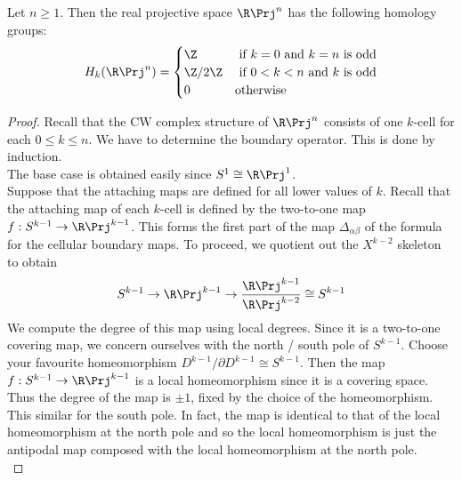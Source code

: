 \documentclass[a4paper]{article}
\begin{document}
\begin{eg}{}{} Let $n\geq 1$. Then the real projective space $\R\Prj^n$ has the following homology groups: $$H_k(\R\Prj^n)=\begin{cases}
\Z & \text{ if }k=0\text{ and }k=n\text{ is odd}\\
\Z/2\Z & \text{ if } 0<k<n\text{ and }k\text{ is odd}\\
0 & \text{otherwise}
\end{cases}$$ 
\begin{proof}
Recall that the CW complex structure of $\R\Prj^n$ consists of one $k$-cell for each $0\leq k\leq n$. We have to determine the boundary operator. This is done by induction. \\

The base case is obtained easily since $S^1\cong\R\Prj^1$. \\

Suppose that the attaching maps are defined for all lower values of $k$. Recall that the attaching map of each $k$-cell is defined by the two-to-one map $f:S^{k-1}\to\R\Prj^{k-1}$. This forms the first part of the map $\Delta_{\alpha\beta}$ of the formula for the cellular boundary maps. To proceed, we quotient out the $X^{k-2}$ skeleton to obtain $$S^{k-1}\to\R\Prj^{k-1}\to\frac{\R\Prj^{k-1}}{\R\Prj^{k-2}}\cong S^{k-1}$$ We compute the degree of this map using local degrees. Since it is a two-to-one covering map, we concern ourselves with the north / south pole of $S^{k-1}$. Choose your favourite homeomorphism $D^{k-1}/\partial D^{k-1}\cong S^{k-1}$. Then the map $f:S^{k-1}\to\R\Prj^{k-1}$ is a local homeomorphism since it is a covering space. Thus the degree of the map is $\pm1$, fixed by the choice of the homeomorphism. This similar for the south pole. In fact, the map is identical to that of the local homeomorphism at the north pole and so the local homeomorphism is just the antipodal map composed with the local homeomorphism at the north pole. \\


\end{proof}
\end{eg}
\end{document}

